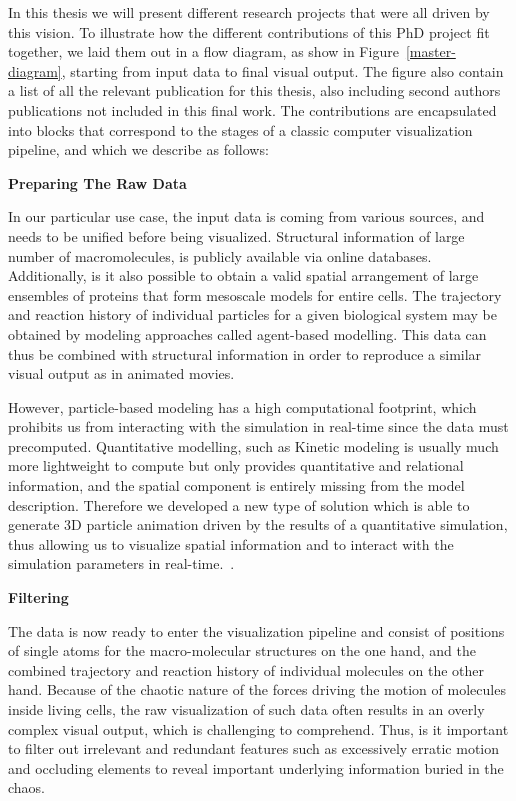 In this thesis we will present different research projects that were all driven by this vision.
To illustrate how the different contributions of this PhD project fit together, we laid them out in a flow diagram, as show in Figure~\ref{master-diagram}, starting from input data to final visual output.
The figure also contain a list of all the relevant publication for this thesis, also including second authors publications not included in this final work.
The contributions are encapsulated into blocks that correspond to the stages of a classic computer visualization pipeline, and which we describe as follows:

\pagebreak

\textbf{Preparing The Raw Data}

In our particular use case, the input data is coming from various sources, and needs to be unified before being visualized.
Structural information of large number of macromolecules, is publicly available via online databases.
Additionally, is it also possible to obtain a valid spatial arrangement of large ensembles of proteins that form mesoscale models for entire cells.
The trajectory and reaction history of individual particles for a given biological system may be obtained by modeling approaches called agent-based modelling.
This data can thus be combined with structural information in order to reproduce a similar visual output as in animated movies.

However, particle-based modeling has a high computational footprint, which prohibits us from interacting with the simulation in real-time since the data must precomputed.
Quantitative modelling, such as Kinetic modeling is usually much more lightweight to compute but only provides quantitative and relational information, and the spatial component is entirely missing from the model description.
Therefore we developed a new type of solution which is able to generate 3D particle animation driven by the results of a quantitative simulation, thus allowing us to visualize spatial information and to interact with the simulation parameters in real-time.~\cite{le2014illustrative}.

\textbf{Filtering}

The data is now ready to enter the visualization pipeline and consist of positions of single atoms for the macro-molecular structures on the one hand, and the combined trajectory and reaction history of individual molecules on the other hand.
Because of the chaotic nature of the forces driving the motion of molecules inside living cells, the raw visualization of such data often results in an overly complex visual output, which is challenging to comprehend.
Thus, is it important to filter out irrelevant and redundant features such as excessively erratic motion and occluding elements to reveal important underlying information buried in the chaos.

